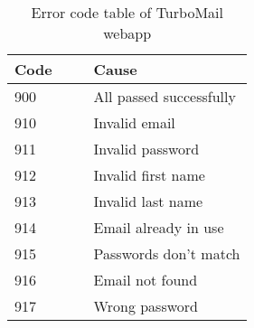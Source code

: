 \documentclass{article}
\begin{document}
\begin{table}[ht]
  \centering
  \begin{tabular}{p{0.33\linewidth}p{0.67\linewidth}}
    \hline
    \textbf{Code} & \textbf{Cause} \\
    \hline
    900 & All passed successfully \\
    910 & Invalid email \\
    911 & Invalid password \\
    912 & Invalid first name\\
    913 & Invalid last name\\
    914 & Email already in use \\
    915 & Passwords don't match \\
    916 & Email not found \\
    917 & Wrong password \\
    \hline
  \end{tabular}
  \caption{Error code table of TurboMail webapp}
  \label{tab:error-code}
\end{table}
\end{document}
